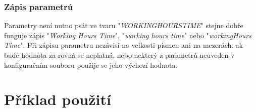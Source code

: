 \documentclass[11pt,a4paper,titlepage]{article}
\begin{document}
\subsubsection{Zápis parametrú}
Parametry není nutno psát ve tvaru "\emph{WORKINGHOURSTIME}" stejne dobře funguje zápis "\emph{Working Hours Time}", "\emph{working hours time}" nebo "\emph{workingHours Time}". Při zápisu parametru nezávisí na veľkosti písmen ani na mezerách. ak bude hodnota za rovná se neplatná, nebo nekterý z parametrú neuveden v konfiguračním souboru použije se jeho výchozí hodnota.

\section{Příklad použití}




\newpage

\end{document}
